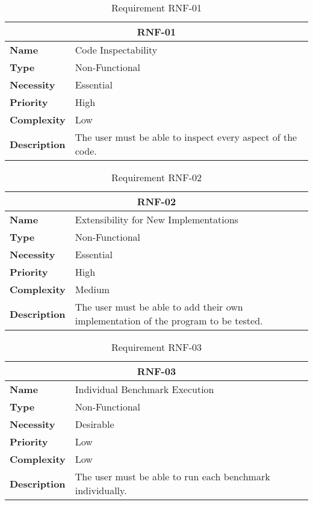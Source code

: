 \begin{table}[H]
    \centering
    \begin{tabular}{l p{10cm}}
        \toprule
        \multicolumn{2}{c}{\textbf{RNF-01}} \\
        \toprule
        \textbf{Name}               & Code Inspectability \\
        \textbf{Type}               & Non-Functional \\
        \textbf{Necessity}          & Essential \\
        \textbf{Priority}           & High \\
        \textbf{Complexity}         & Low \\
        \textbf{Description}        & The user must be able to inspect every aspect of the code. \\
        \bottomrule
    \end{tabular}
\caption{Requirement RNF-01}\label{tab:rnf-01}
\end{table}

\begin{table}[H]
    \centering
    \begin{tabular}{l p{10cm}}
        \toprule
        \multicolumn{2}{c}{\textbf{RNF-02}} \\
        \toprule
        \textbf{Name}               & Extensibility for New Implementations \\
        \textbf{Type}               & Non-Functional \\
        \textbf{Necessity}          & Essential \\
        \textbf{Priority}           & High \\
        \textbf{Complexity}         & Medium \\
        \textbf{Description}        & The user must be able to add their own implementation of the program to be tested. \\
        \bottomrule
    \end{tabular}
\caption{Requirement RNF-02}\label{tab:rnf-02}
\end{table}

\begin{table}[H]
    \centering
    \begin{tabular}{l p{10cm}}
        \toprule
        \multicolumn{2}{c}{\textbf{RNF-03}} \\
        \toprule
        \textbf{Name}               & Individual Benchmark Execution \\
        \textbf{Type}               & Non-Functional \\
        \textbf{Necessity}          & Desirable \\
        \textbf{Priority}           & Low \\
        \textbf{Complexity}         & Low \\
        \textbf{Description}        & The user must be able to run each benchmark individually. \\
        \bottomrule
    \end{tabular}
\caption{Requirement RNF-03}\label{tab:rnf-03}
\end{table}

